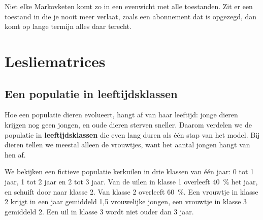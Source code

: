 Niet elke Markovketen komt zo in een evenwicht met alle toestanden. Zit er een toestand in die je nooit meer verlaat, zoals een abonnement dat is opgezegd, dan komt op lange termijn alles daar terecht.

\begin{oefeningen}
\end{oefeningen}

\section{Lesliematrices}

\subsection{Een populatie in leeftijdsklassen}

Hoe een populatie dieren evolueert, hangt af van haar leeftijd: jonge dieren krijgen nog geen jongen, en oude dieren sterven sneller. Daarom verdelen we de populatie in \textbf{leeftijdsklassen} die even lang duren als één stap van het model. Bij dieren tellen we meestal alleen de vrouwtjes, want het aantal jongen hangt van hen af.

We bekijken een fictieve populatie kerkuilen in drie klassen van één jaar: 0 tot 1 jaar, 1 tot 2 jaar en 2 tot 3 jaar. Van de uilen in klasse 1 overleeft 40~\% het jaar, en schuift door naar klasse 2. Van klasse 2 overleeft 60~\%. Een vrouwtje in klasse 2 krijgt in een jaar gemiddeld 1,5 vrouwelijke jongen, een vrouwtje in klasse 3 gemiddeld 2. Een uil in klasse 3 wordt niet ouder dan 3 jaar.


